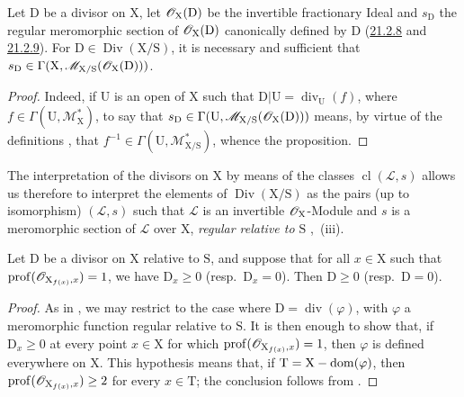 \begin{proposition}[21.15.5]
\label{IV.21.15.5}
Let $\mathrm{D}$ be a divisor on $\mathrm{X}$, let $\mathscr{O}_{\mathrm{X}}(\mathrm{D})$ be the invertible fractionary Ideal and $s_{\mathrm{D}}$ the regular meromorphic section of $\mathscr{O}_{\mathrm{X}}(\mathrm{D})$ canonically defined by $\mathrm{D}$ \textup{(}\hyperref[IV.21.2.8]{21.2.8} and \hyperref[IV.21.2.9]{21.2.9}\textup{)}.
For $\mathrm{D}\in\operatorname{Div}(\mathrm{X}/\mathrm{S})$, it is necessary and sufficient that $s_{\mathrm{D}}\in\Gamma(\mathrm{X},\mathscr{M}_{\mathrm{X}/\mathrm{S}}(\mathscr{O}_{\mathrm{X}}(\mathrm{D})))$.
\end{proposition}

\begin{proof}
Indeed, if $\mathrm{U}$ is an open of $\mathrm{X}$ such that $\mathrm{D}|\mathrm{U}=\operatorname{div}_{\mathrm{U}}(f)$, where $f\in\Gamma(\mathrm{U},\mathscr{M}_{\mathrm{X}}^*)$, to say that $s_{\mathrm{D}}\in\Gamma(\mathrm{U},\mathscr{M}_{\mathrm{X}/\mathrm{S}}(\mathscr{O}_{\mathrm{X}}(\mathrm{D})))$ means, by virtue of the definitions , that $f^{-1}\in\Gamma(\mathrm{U},\mathscr{M}_{\mathrm{X}/\mathrm{S}}^*)$, whence the proposition.
\end{proof}

The interpretation of the divisors on $\mathrm{X}$ by means of the classes $\operatorname{cl}(\mathscr{L},s)$  allows us therefore to interpret the elements of $\operatorname{Div}(\mathrm{X}/\mathrm{S})$ as the pairs (up to isomorphism) $(\mathscr{L},s)$ such that $\mathscr{L}$ is an invertible $\mathscr{O}_{\mathrm{X}}$-Module and $s$ is a meromorphic section of $\mathscr{L}$ over $\mathrm{X}$, \emph{regular relative to $\mathrm{S}$} ,~(iii).

\begin{proposition}[21.15.6]
\label{IV.21.15.6}
Let $\mathrm{D}$ be a divisor on $\mathrm{X}$ relative to $\mathrm{S}$, and suppose that for all $x\in\mathrm{X}$ such that $\operatorname{prof}(\mathscr{O}_{\mathrm{X}_{f(x)},x})=1$, we have $\mathrm{D}_x\geq 0$ \textup{(resp.\ $\mathrm{D}_x=0$)}.
Then $\mathrm{D}\geq 0$ \textup{(resp.\ $\mathrm{D}=0$)}.
\end{proposition}

\begin{proof}
As in , we may restrict to the case where $\mathrm{D}=\operatorname{div}(\varphi)$, with $\varphi$ a meromorphic function regular relative to $\mathrm{S}$. It is then enough to show that, if $\mathrm{D}_x\geq0$ at every point $x\in\mathrm{X}$ for which $\operatorname{prof}(\mathscr{O}_{\mathrm{X}_{f(x)},x})=1$, then $\varphi$ is defined everywhere on $\mathrm{X}$.
This hypothesis means that, if $\mathrm{T}=\mathrm{X}-\operatorname{dom}(\varphi)$, then $\operatorname{prof}(\mathscr{O}_{\mathrm{X}_{f(x)},x})\geq2$ for every $x\in\mathrm{T}$; the conclusion follows from .
\end{proof}

